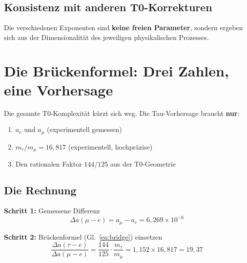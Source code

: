 	\subsection{Konsistenz mit anderen T0-Korrekturen}
	
	\begin{table}[h]
		\centering
		\caption{Universelle fraktale Korrektur mit kontextabhängigem Exponenten}
	\end{table}
	
	Die verschiedenen Exponenten sind \textbf{keine freien Parameter}, sondern ergeben sich aus der Dimensionalität des jeweiligen physikalischen Prozesses.
	
	\section{Die Brückenformel: Drei Zahlen, eine Vorhersage}
	
	Die gesamte T0-Komplexität kürzt sich weg. Die Tau-Vorhersage braucht \textbf{nur}:
	\begin{enumerate}
		\item $a_e$ und $a_\mu$ (experimentell gemessen)
		\item $m_\tau/m_\mu = 16{,}817$ (experimentell, hochpräzise)
		\item Den rationalen Faktor $144/125$ aus der T0-Geometrie
	\end{enumerate}
	
	\subsection{Die Rechnung}
	
	\textbf{Schritt 1:} Gemessene Differenz
	\begin{equation}
		\Delta a(\mu{-}e) = a_\mu - a_e = 6{,}269 \times 10^{-6}
	\end{equation}
	
	\textbf{Schritt 2:} Brückenformel (Gl.~\ref{eq:bridge}) einsetzen
	\begin{equation}
		\frac{\Delta a(\tau{-}e)}{\Delta a(\mu{-}e)} = \frac{144}{125} \cdot \frac{m_\tau}{m_\mu} = 1{,}152 \times 16{,}817 = 19{,}37
	\end{equation}
	
